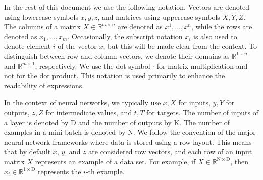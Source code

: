 \documentclass{article}
\newcommand{\const}[1]{\ensuremath{\mathrm{#1}}} %
\newcommand{\Reals}{\mathbb{R}}
\begin{document}
In the rest of this document we use the following notation. Vectors are denoted using lowercase symbols $x, y, z$, and matrices using uppercase symbols $X, Y, Z$. The columns of a matrix $X \in \Reals^{m \times n}$ are denoted as $x^1, \ldots, x^n$, while the rows are denoted as $x_1, \ldots, x_m$. Occasionally, the subscript notation $x_i$ is also used to denote element $i$ of the vector $x$, but this will be made clear from the context.
To distinguish between row and column vectors, we denote their domains as $\Reals^{1 \times n}$ and $\Reals^{m \times 1}$, respectively. We use the dot symbol $\cdot$ for matrix multiplication and not for the dot product. This notation is used primarily to enhance the readability of expressions.

In the context of neural networks, we typically use $x, X$ for inputs, $y, Y$ for outputs, $z, Z$ for intermediate values, and $t, T$ for targets. The number of inputs of a layer is denoted by $\const{D}$ and the number of outputs by $\const{K}$. The number of examples in a mini-batch is denoted by $\const{N}$.
We follow the convention of the major neural network frameworks where data is stored using a row layout. This means that by default $x$, $y$, and $z$ are considered row vectors, and each row of an input matrix $X$ represents an example of a data set. For example, if $X \in \Reals^{\const{N} \times \const{D}}$, then $x_i \in \Reals^{1 \times \const{D}}$ represents the $i$-th example.
\end{document}
